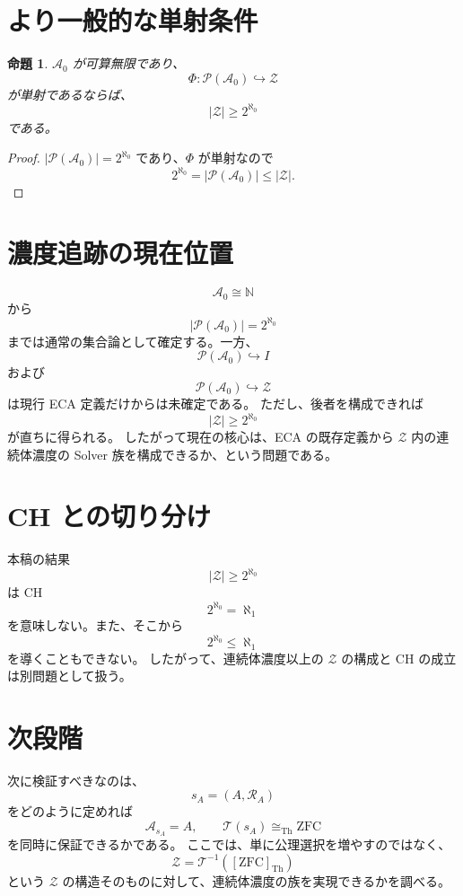 \documentclass[a4paper,11pt]{jsarticle}
\newtheorem{proposition}[definition]{命題}
\newcommand{\Pow}{\mathcal{P}}
\begin{document}
\section{より一般的な単射条件}
\begin{proposition}
$\mathcal{A}_0$ が可算無限であり、
\[
\Phi:\Pow(\mathcal{A}_0)\hookrightarrow\mathcal{Z}
\]
が単射であるならば、
\[
\boxed{|\mathcal{Z}|\geq2^{\aleph_0}}
\]
である。
\end{proposition}
\begin{proof}
$|\Pow(\mathcal{A}_0)|=2^{\aleph_0}$ であり、$\Phi$ が単射なので
\[
2^{\aleph_0}=|\Pow(\mathcal{A}_0)|\leq|\mathcal{Z}|.
\]
\end{proof}
\section{濃度追跡の現在位置}
\[
\mathcal{A}_0\cong\mathbb{N}
\]
から
\[
\boxed{|\Pow(\mathcal{A}_0)|=2^{\aleph_0}}
\]
までは通常の集合論として確定する。一方、
\[
\Pow(\mathcal{A}_0)\hookrightarrow I
\]
および
\[
\Pow(\mathcal{A}_0)\hookrightarrow\mathcal{Z}
\]
は現行 ECA 定義だけからは未確定である。
ただし、後者を構成できれば
\[
\boxed{|\mathcal{Z}|\geq2^{\aleph_0}}
\]
が直ちに得られる。
したがって現在の核心は、ECA の既存定義から $\mathcal{Z}$ 内の連続体濃度の Solver 族を構成できるか、という問題である。
\section{CH との切り分け}
本稿の結果
\[
|\mathcal{Z}|\geq2^{\aleph_0}
\]
は CH
\[
2^{\aleph_0}=\aleph_1
\]
を意味しない。また、そこから
\[
2^{\aleph_0}\leq\aleph_1
\]
を導くこともできない。
したがって、連続体濃度以上の $\mathcal{Z}$ の構成と CH の成立は別問題として扱う。
\section{次段階}
次に検証すべきなのは、
\[
s_A=(A,\mathcal{R}_A)
\]
をどのように定めれば
\[
\mathcal{A}_{s_A}=A,
\qquad
\mathcal{T}(s_A)\cong_{\mathrm{Th}}\mathrm{ZFC}
\]
を同時に保証できるかである。
ここでは、単に公理選択を増やすのではなく、
\[
\mathcal{Z}=\mathcal{T}^{-1}([\mathrm{ZFC}]_{\mathrm{Th}})
\]
という $\mathcal{Z}$ の構造そのものに対して、連続体濃度の族を実現できるかを調べる。
\end{document}
